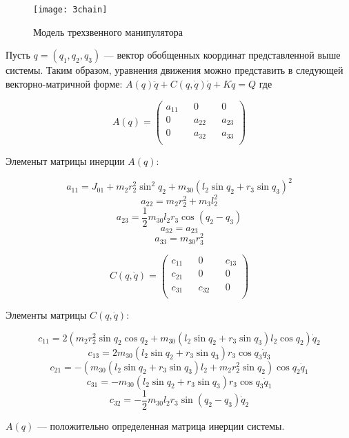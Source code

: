  \begin{figure}[h]
 	\centering
 	\texttt{[image: 3chain]}
 	\caption{Модель трехзвенного манипулятора}
 	\label{fig:manip1}
 \end{figure}
 
 Пусть $q=(q_1, q_2, q_3)$ --- вектор обобщенных координат представленной выше системы. Таким образом, уравнения движения можно представить в следующей векторно-матричной форме: $A(q) \ddot q + C(q, \dot q) \dot q + K \dot q = Q$ где 
 
 \vspace{5mm}
 
 $$A(q) =
 \begin{pmatrix}
 a_{11} && 0 && 0  \\
 0  && a_{22} && a_{23} \\
 0 && a_{32} &&  a_{33}\\
 \end{pmatrix}$$
 
 \vspace{5mm}
 
 Элеменыт матрицы инерции $A(q):$
 
 $$a_{11} = J_{01} + m_2 r_2^2 \sin^2 q_2 + m_{30} (l_2 \sin q_2 + r_3 \sin q_3)^2$$
 $$a_{22} = m_2 r_2^2 + m_3 l_2^2$$
 $$a_{23} = \frac12 m_{30} l_2 r_3 \cos(q_2 - q_3)$$
 $$a_{32} = a_{23}$$
 $$a_{33} = m_{30} r_3^2$$
 
 $$C(q, \dot q)= 
 \begin{pmatrix}
 c_{11} && 0 && c_{13} \\
 c_{21} && 0 && 0 \\
 c_{31} && c_{32} && 0\\
 \end{pmatrix}$$
 
 Элементы матрицы $C(q, \dot q):$
 
 $$c_{11} = 2 (m_2 r_2^2 \sin q_2 \cos q_2 + m_{30} (l_2 \sin q_2 + r_3 \sin q_3) l_2 \cos q_2) \dot q_2$$
 $$c_{13} = 2 m_{30} (l_2 \sin q_2 + r_3 \sin q_3) r_3 \cos q_3 \dot q_3$$
 $$c_{21} = - (m_{30} (l_2 \sin q_2 + r_3 \sin q_3) l_2 + m_2 r_2^2 \sin q_2) \cos q_2 \dot q_1$$
 $$c_{31} = - m_{30} (l_2 \sin q_2 + r_3 \sin q_3) r_3 \cos q_3 \dot q_1$$
 $$c_{32} = - \frac12 m_{30} l_2 r_3 \sin (q_2 - q_3) \dot q_2$$
 
 \vspace{5mm}
 
 $A(q)$ --- положительно определенная матрица инерции системы.
 
